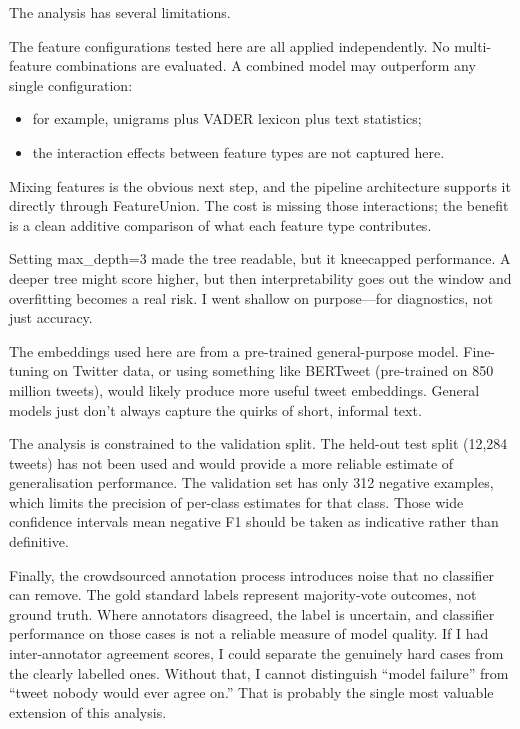 \documentclass[12pt]{article}
\begin{document}
The analysis has several limitations.

The feature configurations tested here are all applied independently. No multi-feature combinations are evaluated. A combined model may outperform any single configuration:

\begin{itemize}

  \item for example, unigrams plus VADER lexicon plus text statistics;

  \item the interaction effects between feature types are not captured here.

\end{itemize} Mixing features is the obvious next step, and the pipeline architecture supports it directly through FeatureUnion. The cost is missing those interactions; the benefit is a clean additive comparison of what each feature type contributes.

Setting max\_depth=3 made the tree readable, but it kneecapped performance. A deeper tree might score higher, but then interpretability goes out the window and overfitting becomes a real risk. I went shallow on purpose---for diagnostics, not just accuracy.

The embeddings used here are from a pre-trained general-purpose model. Fine-tuning on Twitter data, or using something like BERTweet (pre-trained on 850 million tweets), would likely produce more useful tweet embeddings. General models just don't always capture the quirks of short, informal text.

The analysis is constrained to the validation split. The held-out test split (12,284 tweets) has not been used and would provide a more reliable estimate of generalisation performance. The validation set has only 312 negative examples, which limits the precision of per-class estimates for that class. Those wide confidence intervals mean negative F1 should be taken as indicative rather than definitive.

Finally, the crowdsourced annotation process introduces noise that no classifier can remove. The gold standard labels represent majority-vote outcomes, not ground truth. Where annotators disagreed, the label is uncertain, and classifier performance on those cases is not a reliable measure of model quality. If I had inter-annotator agreement scores, I could separate the genuinely hard cases from the clearly labelled ones. Without that, I cannot distinguish ``model failure'' from ``tweet nobody would ever agree on.'' That is probably the single most valuable extension of this analysis.



\nocite{*}




\end{document}
